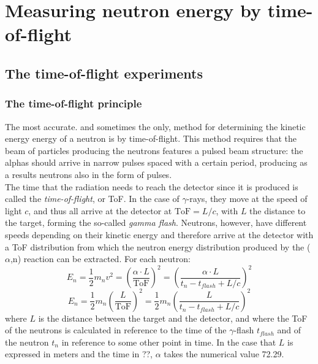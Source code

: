 \documentclass[a4paper,12pt]{report}
\newcommand{\an}{($\alpha$,n) }
\begin{document}

\chapter{Measuring neutron energy by time-of-flight}

\section{The time-of-flight experiments}
\subsection{The time-of-flight principle} 
The most accurate. and sometimes the only, method for determining the kinetic energy energy of a neutron is by time-of-flight.
This method requires that the beam of particles producing the neutrons features a pulsed beam structure: the alphas should arrive in narrow pulses spaced with a certain period, producing as a results neutrons also in the form of pulses.
\\

The time that the radiation needs to reach the detector since it is produced is called the \textit{time-of-flight}, or ToF.
In the case of $\gamma$-rays, they move at the speed of light $c$, and thus all arrive at the detector at $\text{ToF}=L/c$, with $L$ the distance to the target, forming the so-called  \textit{gamma flash}.
Neutrons, however, have different speeds depending on their kinetic energy and therefore arrive at the detector with a ToF distribution from which the neutron energy distribution produced by the \an reaction can be extracted.
For each neutron:
\begin{equation}
	E_n = \frac{1}{2}m_nv^2= \left ( \frac{\alpha \cdot L}{\text{ToF}} \right)^2=
	\left (\frac{\alpha \cdot L}{t_n-t_{flash}+L/c} \right)^2
	\label{Eq_ToF2En}
\end{equation}
\begin{equation}
	E_n=\frac{1}{2} m_n \left( \frac{L}{\text{ToF}} \right)^2 = \frac{1}{2} m_n \left( \frac{L}{t_n - t_{flash} + L/c} \right)^2
\end{equation}
where $L$ is the distance between the target and the detector, and where the ToF of the neutrons is calculated in reference to the time of the $\gamma$-flash $t_{flash}$ and of the neutron $t_n$ in reference to some other point in time.
In the case that $L$ is expressed in meters and the time in ??, $\alpha$ takes the numerical value 72.29. 
\end{document}
